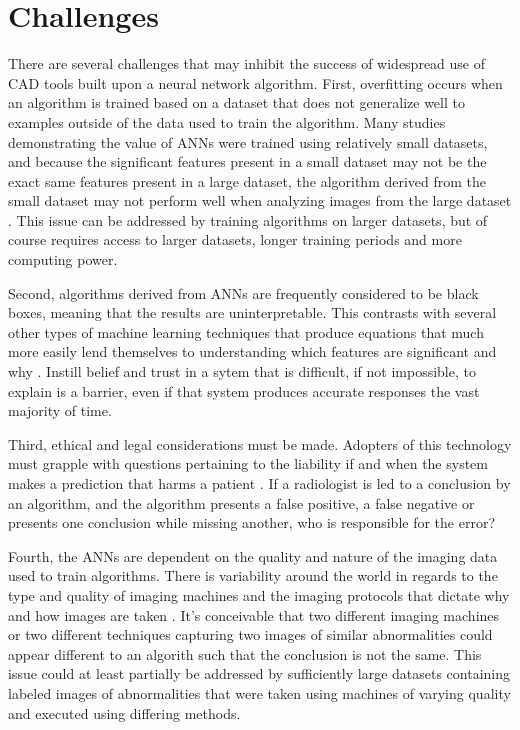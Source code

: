 \documentclass[sigconf]{acmart}
\begin{document}
\section{Challenges}
There are several challenges that may inhibit the success of widespread use of CAD tools built upon a neural network algorithm. First, overfitting occurs when an algorithm is trained based on a dataset that does not generalize well to examples outside of the data used to train the algorithm. Many studies demonstrating the value of ANNs were trained using relatively small datasets, and because the significant features present in a small dataset may not be the exact same features present in a large dataset, the algorithm derived from the small dataset may not perform well when analyzing images from the large dataset \cite{cite08}\cite{cite05}. This issue can be addressed by training algorithms on larger datasets, but of course requires access to larger datasets, longer training periods and more computing power.

Second, algorithms derived from ANNs are frequently considered to be black boxes, meaning that the results are uninterpretable. This contrasts with several other types of machine learning techniques that produce equations that much more easily lend themselves to understanding which features are significant and why \cite{cite05}. Instill belief and trust in a sytem that is difficult, if not impossible, to explain is a barrier, even if that system produces accurate responses the vast majority of time.

Third, ethical and legal considerations must be made. Adopters of this technology must grapple with questions pertaining to the liability if and when the system makes a prediction that harms a patient \cite{cite05}. If a radiologist is led to a conclusion by an algorithm, and the algorithm presents a false positive, a false negative or presents one conclusion while missing another, who is responsible for the error?

Fourth, the ANNs are dependent on the quality and nature of the imaging data used to train algorithms. There is variability around the world in regards to the type and quality of imaging machines and the imaging protocols that dictate why and how images are taken \cite{cite05}. It's conceivable that two different imaging machines or two different techniques capturing two images of similar abnormalities could appear different to an algorith such that the conclusion is not the same. This issue could at least partially be addressed by sufficiently large datasets containing labeled images of abnormalities that were taken using machines of varying quality and executed using differing methods.
\end{document}
